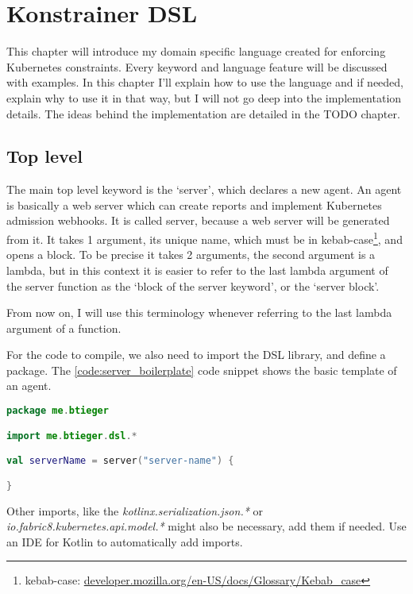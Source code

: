 \chapter{Konstrainer DSL}
\label{chap:konst_dsl}

This chapter will introduce my domain specific language created for enforcing Kubernetes constraints. Every keyword and language feature will be discussed with examples. In this chapter I'll explain how to use the language and if needed, explain why to use it in that way, but I will not go deep into the implementation details. The ideas behind the implementation are detailed in the TODO chapter.

\section{Top level}

The main top level keyword is the `server', which declares a new agent. An agent is basically a web server which can create reports and implement Kubernetes admission webhooks. It is called server, because a web server will be generated from it. It takes 1 argument, its unique name, which must be in kebab-case\footnote{kebab-case: \url{developer.mozilla.org/en-US/docs/Glossary/Kebab_case}}, and opens a block. To be precise it takes 2 arguments, the second argument is a lambda, but in this context it is easier to refer to the last lambda argument of the server function as the `block of the server keyword', or the `server block'.

From now on, I will use this terminology whenever referring to the last lambda argument of a function.

For the code to compile, we also need to import the DSL library, and define a package. The \ref{code:server_boilerplate} code snippet shows the basic template of an agent.

\begin{lstlisting}[caption={Template of a DSL file},language=Kotlin,label=code:server_boilerplate]
package me.btieger

import me.btieger.dsl.*

val serverName = server("server-name") {

}
\end{lstlisting}

Other imports, like the \emph{kotlinx.serialization.json.*} or \emph{io.fabric8.kubernetes.api.model.*} might also be necessary, add them if needed. Use an IDE for Kotlin to automatically add imports.

